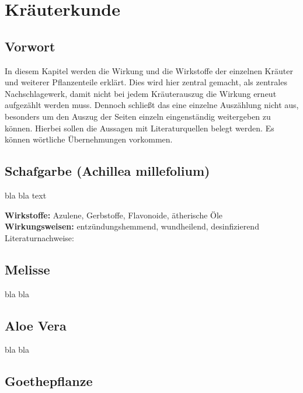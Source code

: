 \chapter{Kräuterkunde}

\section{Vorwort}

In diesem Kapitel werden die Wirkung und die Wirkstoffe der einzelnen Kräuter und weiterer Pflanzenteile erklärt. Dies wird hier zentral gemacht, als zentrales Nachschlagewerk, damit nicht bei jedem Kräuterauszug die Wirkung erneut aufgezählt werden muss. Dennoch schließt das eine einzelne Auszählung nicht aus, besonders um den Auszug der Seiten einzeln eingenständig weitergeben zu können. Hierbei sollen die Aussagen mit Literaturquellen belegt werden. Es können wörtliche Übernehmungen vorkommen.



\section{Schafgarbe (Achillea millefolium)}

bla bla text

\textbf{Wirkstoffe:} Azulene, Gerbstoffe, Flavonoide, ätherische Öle\\

\textbf{Wirkungsweisen:} entzündungshemmend, wundheilend, desinfizierend\\

Literaturnachweise: \cite{nedoma2018heilsalben}

\section{Melisse}

bla bla

\section{Aloe Vera}

bla bla

\section{Goethepflanze}

